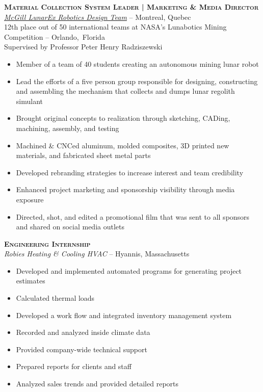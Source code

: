 \documentclass[12pt, letterpaper]{article}
\newcommand{\years}[1]{\marginnote{\footnotesize #1}} %
\begin{document}
	\begin{samepage}
		\years{8/2012 - 8/2013} \textbf{\scshape Material Collection System Leader | Marketing \& Media Director}\\
		\href{http://www.lunarex.mcgill.ca}{\textit{McGill LunarEx Robotics Design Team}} -- Montreal, Quebec\\
		{\small 12th place out of 50 international teams at NASA's Lunabotics Mining Competition -- Orlando,~Florida\\
		Supervised by Professor Peter Henry Radziszewski}
		\begin{itemize}
			\item Member of a team of 40 students creating an autonomous mining lunar robot 
			\item Lead the efforts of a five person group responsible for designing, constructing and assembling the mechanism that collects and dumps lunar regolith simulant
			\item Brought original concepts to realization through sketching, CADing, machining, assembly, and testing
			\item Machined \& CNCed aluminum, molded composites, 3D printed new materials, and fabricated sheet metal parts
			\item Developed rebranding strategies to increase interest and team credibility
			\item Enhanced project marketing and sponsorship visibility through media exposure
			\item Directed, shot, and edited a promotional film that was sent to all sponsors and shared on social media outlets
		\end{itemize}
	\end {samepage}
	\vspace{.1in}


	\begin{samepage}
		\years{Summer 2012 \& Summer~2013} \textbf{\scshape Engineering Internship}\\
		\textit{Robies Heating \& Cooling HVAC} -- Hyannis, Massachusetts
		\begin{itemize}
			\item Developed and implemented automated programs for generating project estimates
			\item Calculated thermal loads
			\item Developed a work flow and integrated inventory management system
			\item Recorded and analyzed inside climate data
			\item Provided company-wide technical support
			\item Prepared reports for clients and staff
			\item Analyzed sales trends and provided detailed reports 
		\end{itemize}
	\end{samepage}
	\vspace{.1in}
\end{document}
